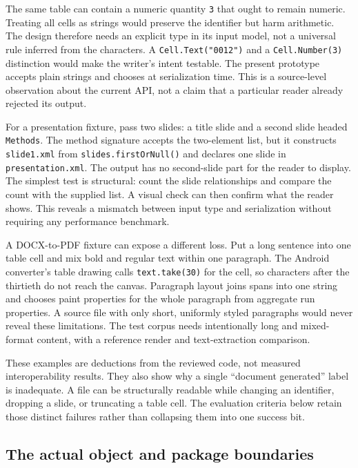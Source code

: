 \documentclass[10pt,letterpaper]{article}
\begin{document}
The same table can contain a numeric quantity \texttt{3} that ought to remain numeric. Treating all cells as strings would preserve the identifier but harm arithmetic. The design therefore needs an explicit type in its input model, not a universal rule inferred from the characters. A \texttt{Cell.Text("0012")} and a \texttt{Cell.Number(3)} distinction would make the writer's intent testable. The present prototype accepts plain strings and chooses at serialization time. This is a source-level observation about the current API, not a claim that a particular reader already rejected its output.

For a presentation fixture, pass two slides: a title slide and a second slide headed \texttt{Methods}. The method signature accepts the two-element list, but it constructs \texttt{slide1.xml} from \texttt{slides.firstOrNull()} and declares one slide in \texttt{presentation.xml}. The output has no second-slide part for the reader to display. The simplest test is structural: count the slide relationships and compare the count with the supplied list. A visual check can then confirm what the reader shows. This reveals a mismatch between input type and serialization without requiring any performance benchmark.

A DOCX-to-PDF fixture can expose a different loss. Put a long sentence into one table cell and mix bold and regular text within one paragraph. The Android converter's table drawing calls \texttt{text.take(30)} for the cell, so characters after the thirtieth do not reach the canvas. Paragraph layout joins spans into one string and chooses paint properties for the whole paragraph from aggregate run properties. A source file with only short, uniformly styled paragraphs would never reveal these limitations. The test corpus needs intentionally long and mixed-format content, with a reference render and text-extraction comparison.

These examples are deductions from the reviewed code, not measured interoperability results. They also show why a single ``document generated'' label is inadequate. A file can be structurally readable while changing an identifier, dropping a slide, or truncating a table cell. The evaluation criteria below retain those distinct failures rather than collapsing them into one success bit.

\subsection{The actual object and package boundaries}
\end{document}
